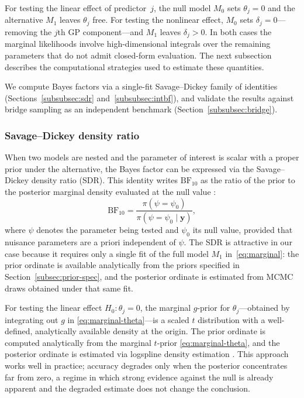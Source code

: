 \documentclass{article}
\begin{document}
For testing the linear effect of predictor~$j$, the null model
$M_0$ sets $\theta_j=0$ and the alternative $M_1$ leaves $\theta_j$
free.
For testing the nonlinear effect, $M_0$ sets $\delta_j=0$---removing
the $j$th GP component---and $M_1$ leaves $\delta_j>0$.
In both cases the marginal likelihoods involve high-dimensional
integrals over the remaining parameters that do not admit closed-form
evaluation.
The next subsection describes the computational strategies used
to estimate these quantities.

We compute Bayes factors via a single-fit Savage--Dickey family of
identities (Sections~\ref{subsubsec:sdr}
and~\ref{subsubsec:intbf}), and validate the results against bridge
sampling as an independent benchmark
(Section~\ref{subsubsec:bridge}).


\subsubsection{Savage--Dickey density ratio\label{subsubsec:sdr}}

When two models are nested and the parameter of interest is scalar
with a proper prior under the alternative, the Bayes factor can be
expressed via the Savage--Dickey density ratio (SDR).
This identity writes $\mathrm{BF}_{10}$ as the ratio of the prior
to the posterior marginal density evaluated at the null value
\parencite{Dickey1971, verdinelli1995}:
%
\begin{equation}
\label{eq:sdr}
\mathrm{BF}_{10}
  = \frac{\pi(\psi = \psi_0)}
         {\pi(\psi = \psi_0 \mid \mathbf{y})},
\end{equation}
%
where $\psi$ denotes the parameter being tested and $\psi_0$ its
null value, provided that nuisance parameters are a priori
independent of $\psi$.
The SDR is attractive in our case because it requires only a
single fit of the full model $M_1$ in~\eqref{eq:marginal}: the
prior ordinate is available analytically from the priors specified
in Section~\ref{subsec:prior-spec}, and the posterior ordinate is
estimated from MCMC draws obtained under that same fit.

For testing the linear effect $H_0:\theta_j=0$, the marginal
$g$-prior for $\theta_j$---obtained by integrating out $g$ in
\eqref{eq:marginal-theta}---is a scaled $t$ distribution with a
well-defined, analytically available density at the origin.
The prior ordinate is computed analytically from the marginal
$t$-prior \eqref{eq:marginal-theta}, and the posterior ordinate is estimated
via logspline density estimation \parencite{kooperberg1992logspline,
WagenmakersEtAl2010}.
This approach works well in practice; accuracy degrades only when
the posterior concentrates far from zero, a regime in which strong
evidence against the null is already apparent and the degraded
estimate does not change the conclusion.
\end{document}
